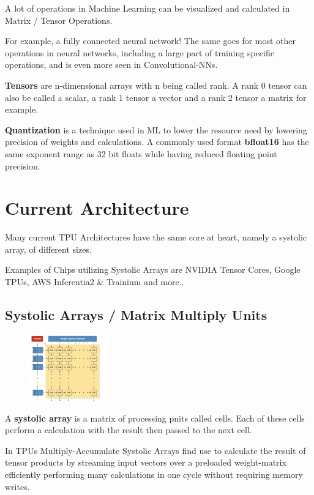 \documentclass{handout}
\begin{document}
A lot of operations in Machine Learning can be visualized and calculated in Matrix / Tensor Operations.

For example, a fully connected neural network! The same goes for most other operations in neural networks, including a large part of training specific operations, and is even more seen in Convolutional-NNs.

\textbf{Tensors} are n-dimensional arrays with n being called rank. A rank 0 tensor can also be called a scalar, a rank 1 tensor a vector and a rank 2 tensor a matrix for example.

\textbf{Quantization} is a technique used in ML to lower the resource need by lowering precision of weights and calculations. A commonly used format \textbf{bfloat16} has the same exponent range as 32 bit floats while having reduced floating point precision.


\section{Current Architecture}
Many current TPU Architectures have the same core at heart, namely a systolic array, of different sizes.

Examples of Chips utilizing Systolic Arrays are NVIDIA Tensor Cores, Google TPUs, AWS Inferentia2 \& Trainium and more..

\subsection{Systolic Arrays / Matrix Multiply Units}
\begin{figure}
    \includegraphics[width=0.3\textwidth]{images/MatrixMultiplayUnit.png}
\end{figure}

A \textbf{systolic array} is a matrix of processing pnits called cells. Each of these cells perform a calculation with the result then passed to the next cell. 

In TPUs Multiply-Accumulate Systolic Arrays find use to calculate the result of tensor products by streaming input vectors over a preloaded weight-matrix efficiently performing many calculations in one cycle without requiring memory writes.
\end{document}
